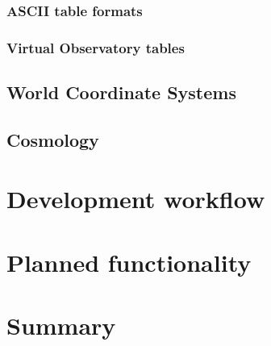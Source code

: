 \documentclass[12pt,preprint]{aastex}
\begin{document}


\subsubsection{ASCII table formats}



\subsubsection{Virtual Observatory tables}



\subsection{World Coordinate Systems}



\subsection{Cosmology}



\section{Development workflow}




\section{Planned functionality}



\section{Summary}

\end{document}
